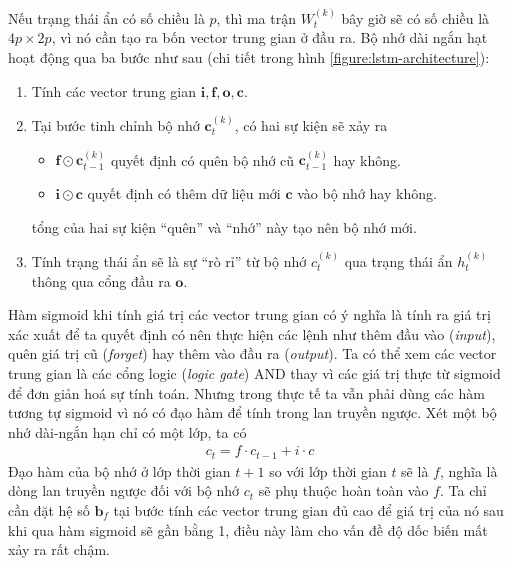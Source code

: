 Nếu trạng thái ẩn có số chiều là $p$, thì ma trận $W_t^{(k)}$ bây giờ sẽ có số chiều là $4p\times 2p$, vì nó cần tạo ra bốn vector trung gian ở đầu ra. Bộ nhớ dài ngắn hạt hoạt động qua ba bước như sau (chi tiết trong hình \ref{figure:lstm-architecture}):
\begin{enumerate}
    \item Tính các vector trung gian $\mathbf{i,f,o,c}$.
    \item Tại bước tinh chỉnh bộ nhớ $\mathbf c_t^{(k)}$, có hai sự kiện sẽ xảy ra
          \begin{itemize}
              \item $\mathbf f\odot\mathbf c_{t-1}^{(k)}$ quyết định có quên bộ nhớ cũ $\mathbf c_{t-1}^{(k)}$ hay không.
              \item $\mathbf i\odot\mathbf c$ quyết định có thêm dữ liệu mới $\mathbf c$ vào bộ nhớ hay không.
          \end{itemize}
          tổng của hai sự kiện ``quên'' và ``nhớ'' này tạo nên bộ nhớ mới.
    \item Tính trạng thái ẩn sẽ là sự ``rò rỉ'' từ bộ nhớ $c_t^{(k)}$ qua trạng thái ẩn $h_t^{(k)}$ thông qua cổng đầu ra $\mathbf o$.
\end{enumerate}

Hàm sigmoid khi tính giá trị các vector trung gian có ý nghĩa là tính ra giá trị xác xuất để ta quyết định có nên thực hiện các lệnh như thêm đầu vào (\textit{input}), quên giá trị cũ (\textit{forget}) hay thêm vào đầu ra (\textit{output}). Ta có thể xem các vector trung gian là các cổng logic (\textit{logic gate}) AND thay vì các giá trị thực từ sigmoid để đơn giản hoá sự tính toán. Nhưng trong thực tế ta vẫn phải dùng các hàm tương tự sigmoid vì nó có đạo hàm để tính trong lan truyền ngược.
Xét một bộ nhớ dài-ngắn hạn chỉ có một lớp, ta có
\begin{align}
    c_t=f\cdot c_{t-1}+i\cdot c
\end{align}
Đạo hàm của bộ nhớ ở lớp thời gian $t+1$ so với lớp thời gian $t$ sẽ là $f$, nghĩa là dòng lan truyền ngược đối với bộ nhớ $c_t$ sẽ phụ thuộc hoàn toàn vào $f$. Ta chỉ cần đặt hệ số $\mathbf b_f$ tại bước tính các vector trung gian đủ cao để giá trị của nó sau khi qua hàm sigmoid sẽ gần bằng 1, điều này làm cho vấn đề độ dốc biến mất xảy ra rất chậm.
